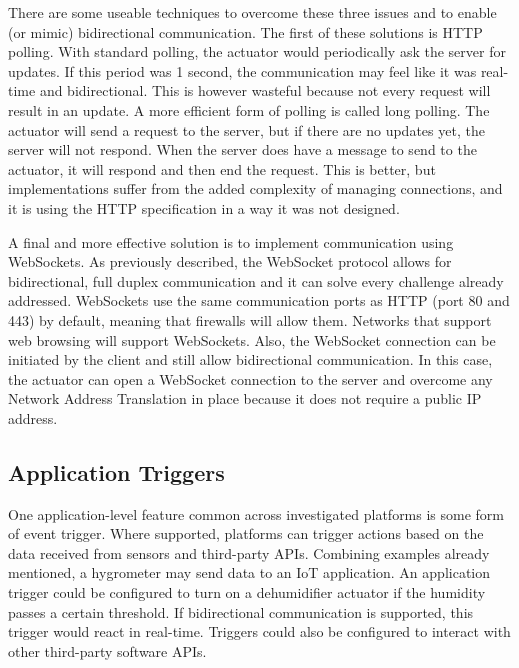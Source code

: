       There are some useable techniques to overcome these three issues and to enable (or mimic) bidirectional communication. The first of these solutions is HTTP polling. With standard polling, the actuator would periodically ask the server for updates. If this period was 1 second, the communication may feel like it was real-time and bidirectional. This is however wasteful because not every request will result in an update. A more efficient form of polling is called long polling. The actuator will send a request to the server, but if there are no updates yet, the server will not respond. When the server does have a message to send to the actuator, it will respond and then end the request. This is better, but implementations suffer from the added complexity of managing connections, and it is using the HTTP specification in a way it was not designed.

      A final and more effective solution is to implement communication using WebSockets. As previously described, the WebSocket protocol allows for bidirectional, full duplex communication and it can solve every challenge already addressed. WebSockets use the same communication ports as HTTP (port 80 and 443) by default, meaning that firewalls will allow them. Networks that support web browsing will support WebSockets. Also, the WebSocket connection can be initiated by the client and still allow bidirectional communication. In this case, the actuator can open a WebSocket connection to the server and overcome any Network Address Translation in place because it does not require a public IP address.

    \subsection{Application Triggers}
      One application-level feature common across investigated platforms is some form of event trigger. Where supported, platforms can trigger actions based on the data received from sensors and third-party APIs. Combining examples already mentioned, a hygrometer may send data to an IoT application. An application trigger could be configured to turn on a dehumidifier actuator if the humidity passes a certain threshold. If bidirectional communication is supported, this trigger would react in real-time. Triggers could also be configured to interact with other third-party software APIs.

